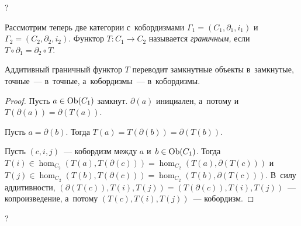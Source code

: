 \documentclass{article}
\begin{document}
?

Рассмотрим теперь две категории с~кобордизмами $\Gamma_1 = (C_1, \partial_1, i_1)$ и~$\Gamma_2 = (C_2, \partial_2, i_2)$.
Функтор $T : C_1 \rightarrow C_2$ называется \textit{граничным,} если $T \circ \partial_1 = \partial_2 \circ T$.

\begin{lemma*}
    Аддитивный граничный функтор $T$ переводит замкнутные объекты в~замкнутые, точные~— в~точные, а~кобордизмы~— в~кобордизмы.
\end{lemma*}

\begin{proof}
    Пусть $a \in \mathrm{Ob}(C_1)$ замкнут. $\partial(a)$ инициален, а~потому и~$T(\partial(a)) = \partial(T(a))$.

    Пусть $a = \partial(b)$. Тогда $T(a) = T(\partial(b)) = \partial(T(b))$.

    Пусть $(c, i, j)$~— кобордизм между $a$ и~$b \in \mathrm{Ob}(C_1)$.
    Тогда $T(i) \in \hom_{C_2}(T(a), T(\partial(c))) = \hom_{C_2}(T(a), \partial(T(c)))$
    и~$T(j) \in \hom_{C_2}(T(b), T(\partial(c))) = \hom_{C_2}(T(b), \partial(T(c)))$.
    В~силу аддитивности, $(\partial(T(c)), T(i), T(j)) = (T(\partial(c)), T(i), T(j))$~— копроизведение,
    а~потому $(T(c), T(i), T(j))$~— кобордизм.
\end{proof}

?

\pagebreak
\end{document}
